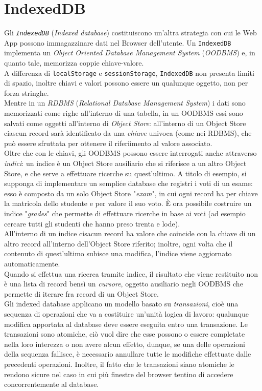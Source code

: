 \documentclass[a4paper, 12pt, twoside, openright]{book}
\begin{document}
\section{IndexedDB} %
Gli \textit{\texttt{IndexedDB}} (\textit{Indexed database}) costituiscono un'altra strategia con cui le Web App possono immagazzinare dati nel Browser dell'utente. Un \texttt{IndexedDB} implementa un \textit{Object Oriented Database Management System} (\textit{OODBMS}) e, in quanto tale, memorizza coppie chiave-valore.\\
A differenza di \texttt{localStorage} e \texttt{sessionStorage}, \texttt{IndexedDB} non presenta limiti di spazio, inoltre chiavi e valori possono essere un qualunque oggetto, non per forza stringhe.\\
Mentre in un \textit{RDBMS} (\textit{Relational Database Management System}) i dati sono memorizzati come righe all'interno di una tabella, in un OODBMS essi sono salvati come oggetti all'interno di \textit{Object Store}: all'interno di un Object Store ciascun record sarà identificato da una \textit{chiave} univoca (come nei RDBMS), che può essere sfruttata per ottenere il riferiìmento al valore associato.\\
Oltre che con le chiavi, gli OODBMS possono essere interrogati anche attraverso \textit{indici}: un indice è un Object Store ausiliario che si riferisce a un altro Object Store, e che serve a effettuare ricerche su quest'ultimo. A titolo di esempio, si supponga di implementare un semplice database che registri i voti di un esame: esso è composto da un solo Object Store "\textit{exam}", in cui ogni record ha per chiave la matricola dello studente e per valore il suo voto. È ora possibile costruire un indice "\textit{grades}" che permette di effettuare ricerche in base ai voti (ad esempio cercare tutti gli studenti che hanno preso trenta e lode).\\
All'interno di un indice cisacun record ha valore che coincide con la chiave di un altro record all'interno dell'Object Store riferito; inoltre, ogni volta che il contenuto di quest'ultimo subisce una modifica, l'indice viene aggiornato automaticamente.\\
Quando si effettua una ricerca tramite indice, il risultato che viene restituito non è una lista di record bensì un \textit{cursore}, oggetto ausiliario negli OODBMS che permette di iterare fra record di un Object Store.\\
Gli indexed database applicano un modello basato su \textit{transazioni}, cioè una sequenza di operazioni che va a costituire un'unità logica di lavoro: qualunque modifica apportata al database deve essere eseguita entro una transazione. Le transazioni sono atomiche, ciò vuol dire che esse possono o essere completate nella loro interezza o non avere alcun effetto, dunque, se una delle operazioni della sequenza fallisce, è necessario annullare tutte le modifiche effettuate dalle precedenti operazioni. Inoltre, il fatto che le transazioni siano atomiche le rendono sicure nel caso in cui più finestre del browser tentino di accedere concorrentemente al database.\\
\end{document}
